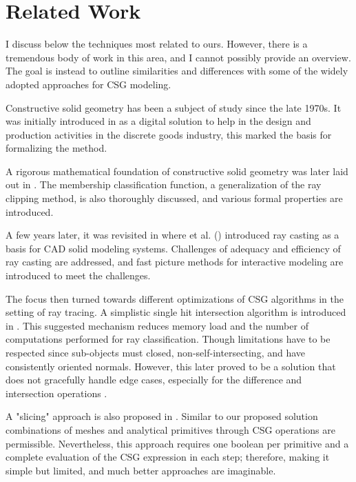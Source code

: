 \documentclass[a4paper,11pt,oneside]{article}
\begin{document}
  
\section{Related Work}
  
I discuss below the techniques most related to ours. However, there is a tremendous body of work in this area, and I cannot possibly provide an overview. The goal is instead to outline similarities and differences with some of the widely adopted approaches for CSG modeling.

Constructive solid geometry has been a subject of study since the late 1970s. It was initially introduced in \cite{GEOMETRIC_MODELING_1977} as a digital solution to help in the design and production activities in the discrete goods industry, this marked the basis for formalizing the method.
  
A rigorous mathematical foundation of constructive solid geometry was later laid out in \cite{Requicha1978MathematicalFO}. The membership classification function, a generalization of the ray clipping method, is also thoroughly discussed, and various formal properties are introduced.
  
A few years later, it was revisited in \cite{ROTH1982109} where \citeauthor{ROTH1982109} et al. (\citeyear{ROTH1982109}) introduced ray casting as a basis for CAD solid modeling systems. Challenges of adequacy and efficiency of ray casting are addressed, and fast picture methods for interactive modeling are introduced to meet the challenges.
  
The focus then turned towards different optimizations of CSG algorithms in the setting of ray tracing. A simplistic single hit intersection algorithm is introduced in \cite{kensler_ray_2006}. This suggested mechanism reduces memory load and the number of computations performed for ray classification. Though limitations have to be respected since sub-objects must closed, non-self-intersecting, and have consistently oriented normals. However, this later proved to be a solution that does not gracefully handle edge cases, especially for the difference and intersection operations \cite{csg-xrt-renderer}.
  
A "slicing" approach is also proposed in \cite{lefebvre:hal-00926861}. Similar to our proposed solution combinations of meshes and analytical primitives through CSG operations are permissible. Nevertheless, this approach requires one boolean per primitive and a complete evaluation of the CSG expression in each step; therefore, making it simple but limited, and much better approaches are imaginable.
\end{document}
